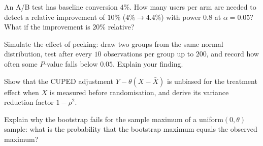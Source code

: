 \begin{exercise}
An A/B test has baseline conversion $4\%$. How many users per arm are needed to detect a relative improvement of $10\%$ ($4\%\to4.4\%$) with power $0.8$ at $\alpha=0.05$? What if the improvement is $20\%$ relative?
\end{exercise}

\begin{exercise}
Simulate the effect of peeking: draw two groups from the same normal distribution, test after every $10$ observations per group up to $200$, and record how often some $P$-value falls below $0.05$. Explain your finding.
\end{exercise}

\begin{exercise}
Show that the CUPED adjustment $Y-\theta(X-\bar{X})$ is unbiased for the treatment effect when $X$ is measured before randomisation, and derive its variance reduction factor $1-\rho^2$.
\end{exercise}

\begin{exercise}
Explain why the bootstrap fails for the sample maximum of a uniform$(0,\theta)$ sample: what is the probability that the bootstrap maximum equals the observed maximum?
\end{exercise}
